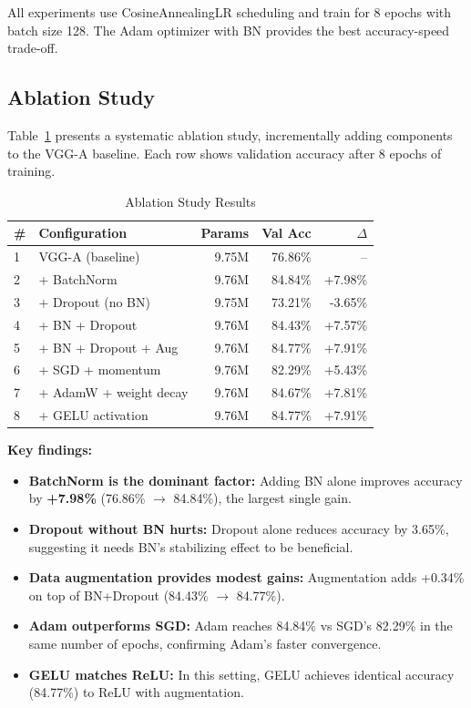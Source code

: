 \documentclass[11pt,a4paper]{article}
\begin{document}
All experiments use CosineAnnealingLR scheduling and train for 8 epochs with batch size 128.
The Adam optimizer with BN provides the best accuracy-speed trade-off.

\subsection{Ablation Study}

Table~\ref{tab:ablation} presents a systematic ablation study, incrementally adding components
to the VGG-A baseline. Each row shows validation accuracy after 8 epochs of training.

\begin{table}[H]
\centering
\caption{Ablation Study Results}
\label{tab:ablation}
\begin{tabular}{@{}llrrr@{}}
\toprule
\textbf{\#} & \textbf{Configuration} & \textbf{Params} & \textbf{Val Acc} & $\Delta$ \\
\midrule
1 & VGG-A (baseline)         & 9.75M & 76.86\% & --     \\
2 & + BatchNorm              & 9.76M & 84.84\% & +7.98\% \\
3 & + Dropout (no BN)        & 9.75M & 73.21\% & -3.65\% \\
4 & + BN + Dropout           & 9.76M & 84.43\% & +7.57\% \\
5 & + BN + Dropout + Aug     & 9.76M & 84.77\% & +7.91\% \\
6 & + SGD + momentum         & 9.76M & 82.29\% & +5.43\% \\
7 & + AdamW + weight decay   & 9.76M & 84.67\% & +7.81\% \\
8 & + GELU activation        & 9.76M & 84.77\% & +7.91\% \\
\bottomrule
\end{tabular}
\end{table}

\textbf{Key findings:}
\begin{itemize}
    \item \textbf{BatchNorm is the dominant factor:} Adding BN alone improves accuracy by
          \textbf{+7.98\%} (76.86\% $\to$ 84.84\%), the largest single gain.
    \item \textbf{Dropout without BN hurts:} Dropout alone reduces accuracy by 3.65\%, suggesting
          it needs BN's stabilizing effect to be beneficial.
    \item \textbf{Data augmentation provides modest gains:} Augmentation adds +0.34\% on top
          of BN+Dropout (84.43\% $\to$ 84.77\%).
    \item \textbf{Adam outperforms SGD:} Adam reaches 84.84\% vs SGD's 82.29\% in the same
          number of epochs, confirming Adam's faster convergence.
    \item \textbf{GELU matches ReLU:} In this setting, GELU achieves identical accuracy (84.77\%)
          to ReLU with augmentation.
\end{itemize}
\end{document}
